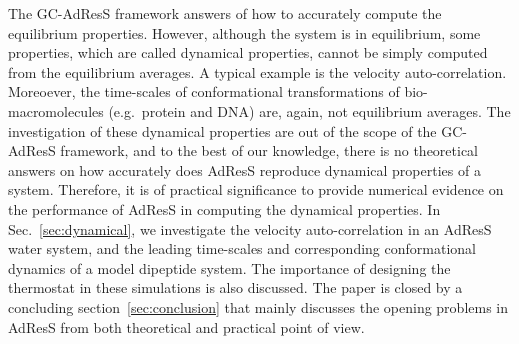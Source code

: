 \documentclass[epjST]{svjour}
\begin{document}
The GC-AdResS framework answers of how to accurately compute the  equilibrium properties.
However, although the system is in equilibrium,
some properties, which are called dynamical properties, cannot be simply computed from the equilibrium averages.
A typical example is the velocity auto-correlation.
Moreoever, the time-scales of conformational transformations
of bio-macromolecules (e.g.~protein and DNA)
are, again, not equilibrium averages.
The investigation of these  dynamical properties are out of the scope of the GC-AdResS framework,
and to the best of our knowledge, there is no theoretical answers on how accurately does AdResS reproduce
dynamical properties of a system.
Therefore, it is of practical significance to  provide numerical
evidence on the performance of AdResS in computing the dynamical properties.
In Sec.~\ref{sec:dynamical}, we investigate the
velocity auto-correlation in an AdResS water system, and the
leading time-scales and corresponding conformational dynamics of
a model dipeptide system.
The importance of designing the thermostat in these simulations
is also discussed.
The paper is closed by a concluding section~\ref{sec:conclusion}
that mainly discusses the opening problems in AdResS from both theoretical
and practical point of view.
\end{document}
